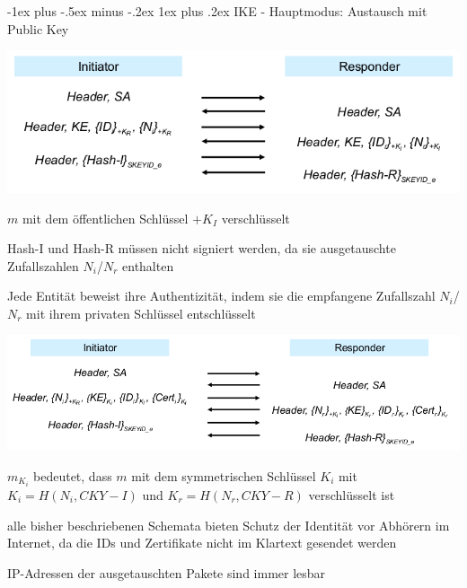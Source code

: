 \documentclass[a4paper]{article}
\makeatletter
\renewcommand{\subsubsection}{\@startsection{subsubsection}{3}{0mm}%
 {-1ex plus -.5ex minus -.2ex}%
 {1ex plus .2ex}%
 {\normalfont\small\bfseries}}
\makeatother
\begin{document}
\begin{multicols}{3}
      \subsubsection{IKE - Hauptmodus: Austausch mit Public Key}
      \begin{itemize*}
            \item \includegraphics[width=.7\linewidth]{Assets/NetworkSecurity-IKE-exchange-public-key.png}
            \item $m$ mit dem öffentlichen Schlüssel $+K_I$ verschlüsselt
            \item Hash-I und Hash-R müssen nicht signiert werden, da sie ausgetauschte Zufallszahlen $N_i$/$N_r$ enthalten
            \item Jede Entität beweist ihre Authentizität, indem sie die empfangene Zufallszahl $N_i$/$N_r$ mit ihrem privaten Schlüssel entschlüsselt
            \item \includegraphics[width=.7\linewidth]{Assets/NetworkSecurity-IKE-exchange-public-key-2.png}
            \item ${m}_{K_i}$ bedeutet, dass $m$ mit dem symmetrischen Schlüssel $K_i$ mit $K_i=H(N_i, CKY-I)$ und $K_r=H(N_r,CKY-R)$ verschlüsselt ist
            \item alle bisher beschriebenen Schemata bieten Schutz der Identität vor Abhörern im Internet, da die IDs und Zertifikate nicht im Klartext gesendet werden
            \item IP-Adressen der ausgetauschten Pakete sind immer lesbar
      \end{itemize*}


\end{multicols}
\end{document}

